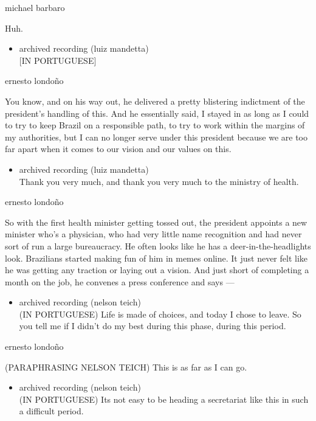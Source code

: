 michael barbaro

Huh.

\begin{itemize}
\tightlist
\item
  archived recording (luiz mandetta)\\
  {[}IN PORTUGUESE{]}
\end{itemize}

ernesto londoño

You know, and on his way out, he delivered a pretty blistering
indictment of the president's handling of this. And he essentially said,
I stayed in as long as I could to try to keep Brazil on a responsible
path, to try to work within the margins of my authorities, but I can no
longer serve under this president because we are too far apart when it
comes to our vision and our values on this.

\begin{itemize}
\tightlist
\item
  archived recording (luiz mandetta)\\
  Thank you very much, and thank you very much to the ministry of
  health.
\end{itemize}

ernesto londoño

So with the first health minister getting tossed out, the president
appoints a new minister who's a physician, who had very little name
recognition and had never sort of run a large bureaucracy. He often
looks like he has a deer-in-the-headlights look. Brazilians started
making fun of him in memes online. It just never felt like he was
getting any traction or laying out a vision. And just short of
completing a month on the job, he convenes a press conference and says
---

\begin{itemize}
\tightlist
\item
  archived recording (nelson teich)\\
  (IN PORTUGUESE) Life is made of choices, and today I chose to leave.
  So you tell me if I didn't do my best during this phase, during this
  period.
\end{itemize}

ernesto londoño

(PARAPHRASING NELSON TEICH) This is as far as I can go.

\begin{itemize}
\tightlist
\item
  archived recording (nelson teich)\\
  (IN PORTUGUESE) Its not easy to be heading a secretariat like this in
  such a difficult period.
\end{itemize}


